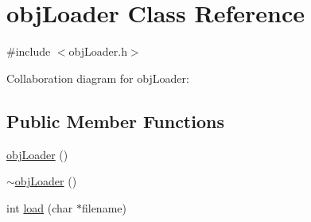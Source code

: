 \hypertarget{classobj_loader}{\section{obj\+Loader Class Reference}
\label{classobj_loader}
}


{\ttfamily \#include $<$obj\+Loader.\+h$>$}



Collaboration diagram for obj\+Loader\+:
\subsection*{Public Member Functions}
\begin{DoxyCompactItemize}
\item 
\hyperlink{classobj_loader_adda1d4defa892f5924d6fcd4edf6d3f8}{obj\+Loader} ()
\item 
\hyperlink{classobj_loader_ae0544f9581456fdf0d820d967c1c3d48}{$\sim$obj\+Loader} ()
\item 
int \hyperlink{classobj_loader_a3dd8724f1e8a00e1e4345087ded8a877}{load} (char $\ast$filename)
\end{DoxyCompactItemize}
